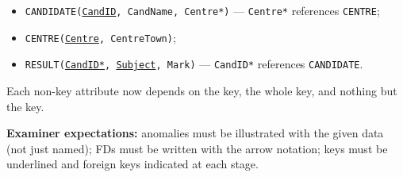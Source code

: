 \documentclass[11pt]{article}
\begin{document}
\begin{corrige}
\begin{enumerate}
\begin{itemize}
\item \texttt{CANDIDATE(\underline{CandID}, CandName, Centre*)} — \texttt{Centre*} references \texttt{CENTRE};
\item \texttt{CENTRE(\underline{Centre}, CentreTown)};
\item \texttt{RESULT(\underline{CandID*}, \underline{Subject}, Mark)} — \texttt{CandID*} references \texttt{CANDIDATE}.
\end{itemize}
Each non-key attribute now depends on the key, the whole key, and nothing but the key.
\end{enumerate}
\textbf{Examiner expectations:} anomalies must be illustrated with the given data (not just named); FDs must be written with the arrow notation; keys must be underlined and foreign keys indicated at each stage.
\end{corrige}
\end{document}
